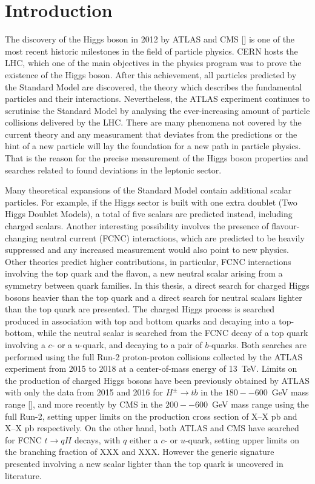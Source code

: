 \setchapterpreamble[u]{\margintoc}
\chapter{Introduction}

The discovery of the Higgs boson in 2012 by ATLAS and CMS [] is one of the most recent historic milestones in the field of particle physics. CERN hosts the LHC, which one of the main objectives in the physics program was to prove the existence of the Higgs boson. After this achievement, all particles predicted by the Standard Model are discovered, the theory which describes the fundamental particles and their interactions. Nevertheless, the ATLAS experiment continues to scrutinise the Standard Model by analysing the ever-increasing amount of particle collisions delivered by the LHC. There are many phenomena not covered by the current theory and any measurament that deviates from the predictions or the hint of a new particle will lay the foundation for a new path in particle physics. That is the reason for the precise measurement of the Higgs boson properties and searches related to found deviations in the leptonic sector.

Many theoretical expansions of the Standard Model contain additional scalar particles. For example, if the Higgs sector is built with one extra doublet (Two Higgs Doublet Models), a total of five scalars are predicted instead, including charged scalars. Another interesting possibility involves the presence of flavour-changing neutral current (FCNC) interactions, which are predicted to be heavily suppressed and any increased measurement would also point to new physics. Other theories predict higher contributions, in particular, FCNC interactions involving the top quark and the flavon, a new neutral scalar arising from a symmetry between quark families.
In this thesis, a direct search for charged Higgs bosons heavier than the top quark and a direct search for neutral scalars lighter than the top quark are presented. The charged Higgs process is searched produced in association with top and bottom quarks and decaying into a top-bottom, while the neutral scalar is searched from the FCNC decay of a top quark involving a $c$- or a $u$-quark, and decaying to a pair of $b$-quarks. Both searches are performed using the full Run-2 proton-proton collisions collected by the ATLAS experiment from 2015 to 2018 at a center-of-mass energy of 13~TeV. Limits on the production of charged Higgs bosons have been previously obtained by ATLAS with only the data from 2015 and 2016 for $H^\pm\to tb$ in the $180--600$~GeV mass range [], and more recently by CMS in the $200--600$~GeV mass range using the full Run-2, setting upper limits on the production cross section of X--X pb and X--X pb respectively. On the other hand, both ATLAS and CMS have searched for FCNC $t\to qH$ decays, with $q$ either a $c$- or $u$-quark, setting upper limits on the branching fraction of XXX and XXX. However the generic signature presented involving a new scalar lighter than the top quark is uncovered in literature.

